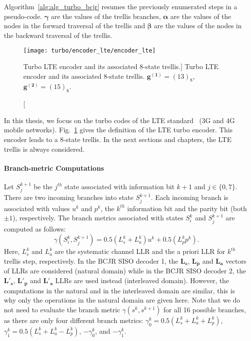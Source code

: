 Algorithm~\ref{alg:alg_turbo_bcjr} resumes the previously enumerated steps in
a pseudo-code. $\bm{\gamma}$ are the values of the trellis branches,
$\bm{\alpha}$ are the values of the nodes in the forward traversal of the
trellis and $\bm{\beta}$ are the values of the nodes in the backward traversal
of the trellis.

\begin{figure}[htp]
  \centering
  \texttt{[image: turbo/encoder\_lte/encoder\_lte]}
  \caption
    [Turbo LTE encoder and its associated 8-state trellis.]
    {Turbo LTE encoder and its associated 8-state trellis.
     $\bm{g^{(1)}} = (13)_8$, $\bm{g^{(2)}} = (15)_8$.}
  \label{fig:alg_turbo_encoder_lte}
\end{figure}

In this thesis, we focus on the turbo codes of the LTE standard~\cite{ETSI2013}
(3G and 4G mobile networks). Fig.~\ref{fig:alg_turbo_encoder_lte} gives the
definition of the LTE turbo encoder. This encoder leads to a 8-state trellis. In
the next sections and chapters, the LTE trellis is always considered.

\paragraph{Branch-metric Computations}

Let $S_j^{k+1}$ be the $j^{th}$ state associated with information bit $k+1$ and
$j \in \{0,7\}$. There are two incoming branches into state $S_j^{k+1}$. Each
incoming branch is associated with values $u^k$ and $p^k$, the $k^{th}$
information bit and the parity bit (both $\pm1$), respectively. The branch
metrics associated with states $S_i^k$ and $S_j^{k+1}$ are computed as follows:
\begin{equation}
\label{eq:alg_turbo_gamma}
 \gamma(S_i^k, S_j^{k+1}) = 0.5(L_{s}^k + L_a^k)u^k + 0.5(L_p^k p^k).
\end{equation}
Here, $L_{s}^k$ and $L_a^k$ are the systematic channel LLR and the a priori
LLR for $k^{th}$ trellis step, respectively.
In the BCJR SISO decoder 1, the $\bm{L_{s}}$, $\bm{L_{p}}$ and $\bm{L_{a}}$
vectors of LLRs are considered (natural domain) while in the BCJR SISO decoder
2, the $\bm{L'_{s}}$, $\bm{L'_{p}}$ and $\bm{L'_{a}}$ LLRs are used instead
(interleaved domain). However, the computations in the natural and in the
interleaved domain are similar, this is why only the operations in the natural
domain are given here. Note that we do not need to evaluate the branch metric
$\gamma(s^k , s^{k+1})$ for all 16 possible branches, as there are only four
different branch metrics:
$\gamma^k_0 = 0.5(L_{s}^k + L_a^k + L_p^k)$,
$\gamma^k_1 = 0.5(L_{s}^k + L_a^k - L_p^k)$, $-\gamma^k_0$, and $-\gamma^k_1$.

